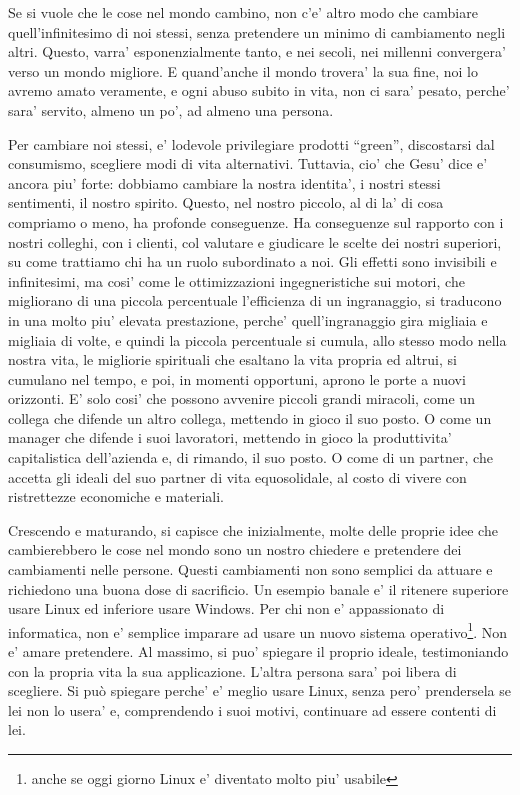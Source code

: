 Se si vuole che le cose nel mondo cambino, non c'e' altro modo che cambiare quell'infinitesimo di noi stessi, senza pretendere un minimo di cambiamento negli altri. Questo, varra' esponenzialmente tanto, e nei secoli, nei millenni convergera' verso un mondo migliore. E quand'anche il mondo trovera' la sua fine, noi lo avremo amato veramente, e ogni abuso subito in vita, non ci sara' pesato, perche' sara' servito, almeno un po', ad almeno una persona.

Per cambiare noi stessi, e' lodevole privilegiare prodotti ``green'', discostarsi dal consumismo, scegliere modi di vita alternativi. Tuttavia, cio' che Gesu' dice e' ancora piu' forte: dobbiamo cambiare la nostra identita', i nostri stessi sentimenti, il nostro spirito. Questo, nel nostro piccolo, al di la' di cosa compriamo o meno, ha profonde conseguenze. Ha conseguenze sul rapporto con i nostri colleghi, con i clienti, col valutare e giudicare le scelte dei nostri superiori, su come trattiamo chi ha un ruolo subordinato a noi. Gli effetti sono invisibili e infinitesimi, ma cosi' come le ottimizzazioni ingegneristiche sui motori, che migliorano di una piccola percentuale l'efficienza di un ingranaggio, si traducono in una molto piu' elevata prestazione, perche' quell'ingranaggio gira migliaia e migliaia di volte, e quindi la piccola percentuale si cumula, allo stesso modo nella nostra vita, le migliorie spirituali che esaltano la vita propria ed altrui, si cumulano nel tempo, e poi, in momenti opportuni, aprono le porte a nuovi orizzonti. E' solo cosi' che possono avvenire piccoli grandi miracoli, come un collega che difende un altro collega, mettendo in gioco il suo posto. O come un manager che difende i suoi lavoratori, mettendo in gioco la produttivita' capitalistica dell'azienda e, di rimando, il suo posto. O come di un partner, che accetta gli ideali del suo partner di vita equosolidale, al costo di vivere con ristrettezze economiche e materiali.

Crescendo e maturando, si capisce che inizialmente, molte delle proprie idee che cambierebbero le cose nel mondo sono un nostro chiedere e pretendere dei cambiamenti nelle persone. Questi cambiamenti non sono semplici da attuare e richiedono una buona dose di sacrificio. Un esempio banale e' il ritenere superiore usare Linux ed inferiore usare Windows. Per chi non e' appassionato di informatica, non e' semplice imparare ad usare un nuovo sistema operativo\footnote{anche se oggi giorno Linux e' diventato molto piu' usabile}.
Non e' amare pretendere. Al massimo, si puo' spiegare il proprio ideale, testimoniando con la propria vita la sua applicazione. L'altra persona sara' poi libera di scegliere. Si può spiegare perche' e' meglio usare Linux, senza pero' prendersela se lei non lo usera' e, comprendendo i suoi motivi, continuare ad essere contenti di lei.

